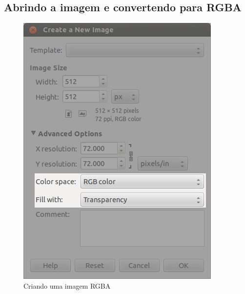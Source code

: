 \documentclass[12pt,onecolumn]{article}
\begin{document}
  \subsection{Abrindo a imagem e convertendo para RGBA}
    \begin{figure}[H]
      \centering
      \includegraphics[width=.7\linewidth]{screenshots/00-grayscale_to_RGBA.png}
      \caption{Criando uma imagem RGBA}
      \label{fig:grayscale_to_RGBA}
    \end{figure}
    
\end{document}
